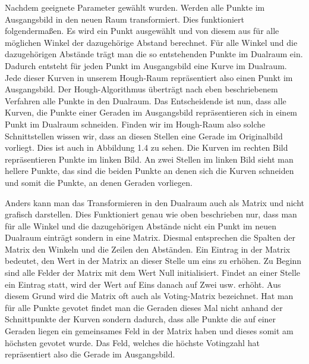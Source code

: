 \documentclass[a4paper,12pt]{article}
\begin{document}
Nachdem geeignete Parameter gewählt wurden. Werden alle Punkte im Ausgangsbild in den neuen Raum transformiert. Dies funktioniert folgendermaßen. Es wird ein Punkt ausgewählt und von diesem aus für alle möglichen Winkel der dazugehörige Abstand berechnet. Für alle Winkel und die dazugehörigen Abstände trägt man die so entstehenden Punkte im Dualraum ein. Dadurch entsteht für jeden Punkt im Ausgangsbild eine Kurve im Dualraum. Jede dieser Kurven in unserem Hough-Raum repräsentiert also einen Punkt im Ausgangsbild. Der Hough-Algorithmus überträgt nach eben beschriebenem Verfahren alle Punkte in den Dualraum. Das Entscheidende ist nun, dass alle Kurven, die Punkte einer Geraden im Ausgangsbild repräsentieren sich in einem Punkt im Dualraum schneiden. Finden wir im Hough-Raum also solche Schnittstellen wissen wir, dass an diesen Stellen eine Gerade im Originalbild vorliegt. Dies ist auch in Abbildung 1.4 zu sehen. Die Kurven im rechten Bild repräsentieren Punkte im linken Bild. An zwei Stellen im linken Bild sieht man hellere Punkte, das sind die beiden Punkte an denen sich die Kurven schneiden und somit die Punkte, an denen Geraden vorliegen.

Anders kann man das Transformieren in den Dualraum auch als Matrix und nicht grafisch darstellen. Dies Funktioniert genau wie oben beschrieben nur, dass man für alle Winkel und die dazugehörigen Abstände nicht ein Punkt im neuen Dualraum einträgt sondern in eine Matrix. Diesmal entsprechen die Spalten der Matrix den Winkeln und die Zeilen den Abständen. Ein Eintrag in der Matrix bedeutet, den Wert in der Matrix an dieser Stelle um eins zu erhöhen. Zu Beginn sind alle Felder der Matrix mit dem Wert Null initialisiert. Findet an einer Stelle ein Eintrag statt, wird der Wert auf Eins danach auf Zwei usw. erhöht. Aus diesem Grund wird die Matrix oft auch als Voting-Matrix bezeichnet. Hat man für alle Punkte gevotet findet man die Geraden dieses Mal nicht anhand der Schnittpunkte der Kurven sondern dadurch, dass alle Punkte die auf einer Geraden liegen ein gemeinsames Feld in der Matrix haben und dieses somit am höchsten gevotet wurde. Das Feld, welches die höchste Votingzahl hat repräsentiert also die Gerade im Ausgangsbild.
\end{document}
